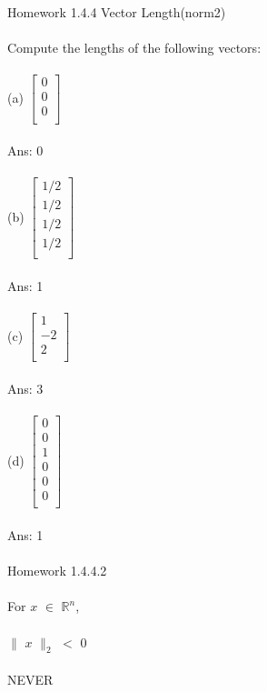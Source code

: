\documentclass[11pt]{article}
\begin{document}
Homework 1.4.4 Vector Length(norm2)
\\
\\
Compute the lengths of the following vectors:
\\
\\
(a)
$
\begin{bmatrix}
{0}\\
{0}\\
{0}\\
\end{bmatrix}$
\\
\\
Ans: 0
\\
\\
(b)
$
\begin{bmatrix}
{1/2}\\
{1/2}\\
{1/2}\\
{1/2}\\
\end{bmatrix}$
\\
\\
Ans: 1
\\
\\
(c)
$
\begin{bmatrix}
{1}\\
{-2}\\
{2}\\
\end{bmatrix}$
\\
\\
Ans: 3
\\
\\
(d)
$
\begin{bmatrix}
{0}\\
{0}\\
{1}\\
{0}\\
{0}\\
{0}\\
\end{bmatrix}$
\\
\\
Ans: 1
\\
\\
Homework 1.4.4.2
\\
\\
For $x$ $\in$ $\mathbb{R}^n$,
\\
\\
$\parallel$ $x$ $\parallel_{2}$ $<$ 0
\\
\\
NEVER
\\
\\
\end{document}
